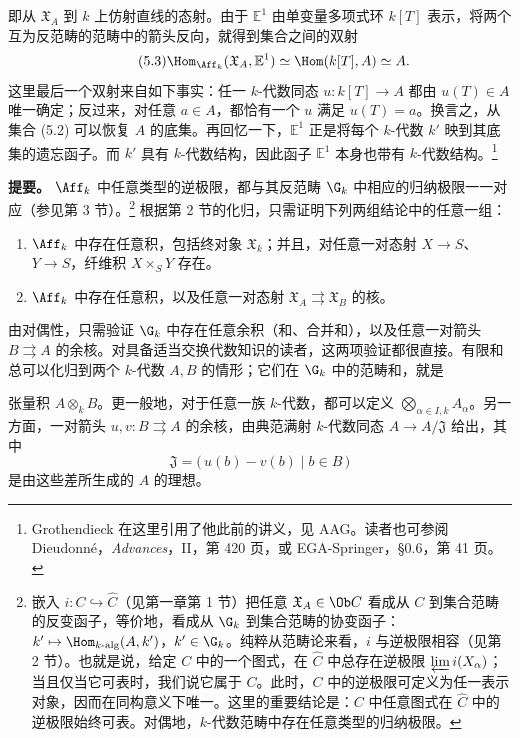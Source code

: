 即从 $\mathfrak X_A$ 到 $k$ 上仿射直线的态射。由于 $\mathbb E^1$ 由单变量多项式环 $k[T]$ 表示，将两个互为反范畴的范畴中的箭头反向，就得到集合之间的双射
\begin{equation}\tag{5.3}
\Hom_{\Aff_k}(\mathfrak X_A,\mathbb E^1)
\simeq\Hom(k[T],A)\simeq A.
\end{equation}
这里最后一个双射来自如下事实：任一 $k$-代数同态 $u:k[T]\to A$ 都由 $u(T)\in A$ 唯一确定；反过来，对任意 $a\in A$，都恰有一个 $u$ 满足 $u(T)=a$。换言之，从集合 (5.2) 可以恢复 $A$ 的底集。再回忆一下，$\mathbb E^1$ 正是将每个 $k$-代数 $k'$ 映到其底集的遗忘函子。而 $k'$ 具有 $k$-代数结构，因此函子 $\mathbb E^1$ 本身也带有 $k$-代数结构。\footnote{Grothendieck 在这里引用了他此前的讲义，见 AAG。读者也可参阅 Dieudonné，\textit{Advances}，II，第 420 页，或 EGA-Springer，\S 0.6，第 41 页。}

\textbf{提要。} $\Aff_k$ 中任意类型的逆极限，都与其反范畴 $\G_k$ 中相应的归纳极限一一对应（参见第 3 节）。\footnote{嵌入 $i:C\hookrightarrow\widehat C$（见第一章第 1 节）把任意 $\mathfrak X_A\in\Ob C$ 看成从 $C$ 到集合范畴的反变函子，等价地，看成从 $\G_k$ 到集合范畴的协变函子：$k'\mapsto\Hom_{k\text{-alg}}(A,k')$，$k'\in\G_k$。纯粹从范畴论来看，$i$ 与逆极限相容（见第 2 节）。也就是说，给定 $C$ 中的一个图式，在 $\widehat C$ 中总存在逆极限 $\varprojlim i(X_\alpha)$；当且仅当它可表时，我们说它属于 $C$。此时，$C$ 中的逆极限可定义为任一表示对象，因而在同构意义下唯一。这里的重要结论是：$C$ 中任意图式在 $\widehat C$ 中的逆极限始终可表。对偶地，$k$-代数范畴中存在任意类型的归纳极限。}
根据第 2 节的化归，只需证明下列两组结论中的任意一组：
\begin{enumerate}[label=\arabic*)]
\item $\Aff_k$ 中存在任意积，包括终对象 $\mathfrak X_k$；并且，对任意一对态射 $X\to S$、$Y\to S$，纤维积 $X\times_S Y$ 存在。
\item $\Aff_k$ 中存在任意积，以及任意一对态射 $\mathfrak X_A\rightrightarrows\mathfrak X_B$ 的核。
\end{enumerate}
由对偶性，只需验证 $\G_k$ 中存在任意余积（和、合并和），以及任意一对箭头 $B\rightrightarrows A$ 的余核。对具备适当交换代数知识的读者，这两项验证都很直接。有限和总可以化归到两个 $k$-代数 $A,B$ 的情形；它们在 $\G_k$ 中的范畴和，就是

张量积 $A\otimes_k B$。更一般地，对于任意一族 $k$-代数，都可以定义 $\bigotimes_{\alpha\in I,k} A_\alpha$。另一方面，一对箭头 $u,v:B\rightrightarrows A$ 的余核，由典范满射 $k$-代数同态 $A\to A/\mathfrak J$ 给出，其中
\[
\mathfrak J=\bigl(\,u(b)-v(b)\mid b\in B\,\bigr)
\]
是由这些差所生成的 $A$ 的理想。

